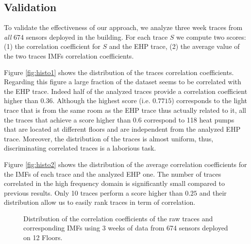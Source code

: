 \subsection{Validation}
To validate the effectiveness of our approach, we analyze three week traces from \emph{all} 
674 sensors deployed in the building.
For each trace $S$ we compute two scores: (1) the correlation coefficient for $S$ and the EHP trace, (2) the average value of the two traces IMFs correlation coefficients.

Figure \ref{fig:histo1} shows the distribution of the traces correlation coefficients.
Regarding this figure a large fraction of the dataset seems to be correlated with the EHP trace.
Indeed half of the analyzed traces provide a correlation coefficient higher than $0.36$.
Although the highest score (i.e. $0.7715$) corresponds to the light trace that is from the same room as the EHP trace thus actually related to it, all the traces that achieve a score higher than $0.6$  correspond to 118 heat pumps that are located at different floors and are independent from the analyzed EHP trace.
Moreover, the distribution of the traces is almost uniform, thus, discriminating correlated traces is a laborious task.

Figure \ref{fig:histo2} shows the distribution of the average correlation coefficients for the IMFs of each trace and the analyzed EHP one.
The number of traces correlated in the high frequency domain is significantly small compared to previous results. 
Only 10 traces perform a score higher than $0.25$ and their distribution allow us to easily rank traces in term of correlation.

\begin{figure}[tbh!]
\centering
 \caption{Distribution of the correlation coefficients of the raw traces and corresponding IMFs using 3 weeks of data from 674 sensors deployed on 12 Floors.}
\label{fig:histo}
\end{figure}

